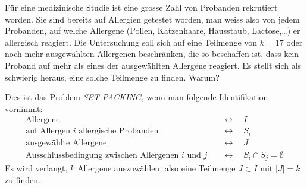 Für eine medizinische Studie ist eine grosse Zahl von Probanden rekrutiert
worden.
Sie sind bereits auf Allergien getestet worden, man weiss also von jedem
Probanden, auf welche Allergene (Pollen, Katzenhaare, Hausstaub, Lactose,\dots)
er allergisch reagiert.
Die Untersuchung soll sich auf eine Teilmenge von $k=17$ oder noch
mehr ausgewählten
Allergenen beschränken, die so beschaffen ist, dass kein Proband auf mehr als 
eines der ausgewählten Allergene reagiert.
Es stellt sich als schwierig heraus, eine solche Teilmenge zu finden.
Warum?


\begin{loesung}
Dies ist das Problem {\em SET-PACKING}, wenn man folgende Identifikation
vornimmt:
\begin{align*}
\text{Allergene}                            &\quad\leftrightarrow\quad I\\
\text{auf Allergen $i$ allergische Probanden}&\quad\leftrightarrow\quad S_i\\
\text{ausgewählte Allergene}               &\quad\leftrightarrow\quad J\\
\text{Ausschlussbedingung zwischen Allergenen $i$ und $j$}&\quad\leftrightarrow\quad S_i\cap S_j = \emptyset
\end{align*}
Es wird verlangt, $k$ Allergene auszuwählen, also eine Teilmenge
$J\subset I$ mit $|J|=k$ zu finden.
\end{loesung}

